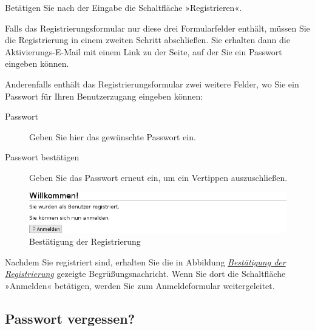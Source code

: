 \documentclass[a4paper,12pt,ngerman]{manual}
\begin{document}
Betätigen Sie nach der Eingabe die Schaltfläche »Registrieren«.

Falls das Registrierungsformular nur diese drei Formularfelder
enthält, müssen Sie die Registrierung in einem zweiten Schritt
abschließen. Sie erhalten dann die Aktivierungs-E-Mail mit einem Link
zu der Seite, auf der Sie ein Passwort eingeben können.

Anderenfalls enthält das Registrierungsformular zwei weitere Felder, wo Sie
ein Passwort für Ihren Benutzerzugang eingeben können:
\begin{description}
\item[Passwort] \leavevmode
Geben Sie hier das gewünschte Passwort ein.

\item[Passwort bestätigen] \leavevmode
Geben Sie das Passwort erneut ein, um ein Vertippen
auszuschließen.

\end{description}
\hypertarget{fig-willkommen-anmelden}{}\begin{figure}[htbp]
\centering

\includegraphics{willkommen.png}
\caption{Bestätigung der Registrierung}\end{figure}

Nachdem Sie registriert sind, erhalten Sie die in Abbildung
\hyperlink{fig-willkommen-anmelden}{\emph{Bestätigung der Registrierung}} gezeigte Begrüßungsnachricht. Wenn Sie
dort die Schaltfläche »Anmelden« betätigen, werden Sie zum
Anmeldeformular weitergeleitet.
\hypertarget{sec-passwort-vergessen}{}

\subsection{Passwort vergessen?}
\end{document}
